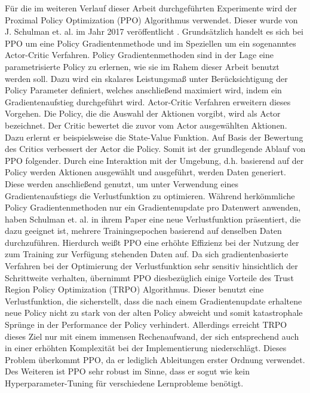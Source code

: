 Für die im weiteren Verlauf dieser Arbeit durchgeführten Experimente wird der Proximal Policy Optimization (PPO) Algorithmus verwendet. Dieser wurde von J. Schulman et. al. im Jahr 2017 veröffentlicht \cite{PPO}. Grundsätzlich handelt es sich bei PPO um eine Policy Gradientenmethode und im Speziellen um ein sogenanntes Actor-Critic Verfahren. Policy Gradientenmethoden sind in der Lage eine parametrisierte Policy zu erlernen, wie sie im Rahem dieser Arbeit benutzt werden soll. Dazu wird ein skalares Leistungsmaß unter Berücksichtigung der Policy Parameter definiert, welches anschließend maximiert wird, indem ein Gradientenaufstieg durchgeführt wird. Actor-Critic Verfahren erweitern dieses Vorgehen. Die Policy, die die Auswahl der Aktionen vorgibt, wird als Actor bezeichnet. Der Critic bewertet die zuvor vom Actor ausgewählten Aktionen. Dazu erlernt er beispielsweise die State-Value Funktion. Auf Basis der Bewertung des Critics verbessert der Actor die Policy. Somit ist der grundlegende Ablauf von PPO folgender. Durch eine Interaktion mit der Umgebung, d.h. basierend auf der Policy werden Aktionen ausgewählt und ausgeführt, werden Daten generiert. Diese werden anschließend genutzt, um unter Verwendung eines Gradientenaufstiegs die Verlustfunktion zu optimieren. Während herkömmliche Policy Gradientenmethoden nur ein Gradientenupdate pro Datenwert anwenden, haben Schulman et. al. in ihrem Paper eine neue Verlustfunktion präsentiert, die dazu geeignet ist, mehrere Trainingsepochen basierend auf denselben Daten durchzuführen. Hierdurch weißt PPO eine erhöhte Effizienz bei der Nutzung der zum Training zur Verfügung stehenden Daten auf. Da sich gradientenbasierte Verfahren bei der Optimierung der Verlustfunktion sehr sensitiv hinsichtlich der Schrittweite verhalten, übernimmt PPO diesbezüglich einige Vorteile des Trust Region Policy Optimization (TRPO) Algorithmus. Dieser benutzt eine Verlustfunktion, die sicherstellt, dass die nach einem Gradientenupdate erhaltene neue Policy nicht zu stark von der alten Policy abweicht und somit katastrophale Sprünge in der Performance der Policy verhindert. Allerdings erreicht TRPO dieses Ziel nur mit einem immensen Rechenaufwand, der sich entsprechend auch in einer erhöhten Komplexität bei der Implementierung niederschlägt. Dieses Problem überkommt PPO, da er lediglich Ableitungen erster Ordnung verwendet. Des Weiteren ist PPO sehr robust im Sinne, dass er sogut wie kein Hyperparameter-Tuning für verschiedene Lernprobleme benötigt. \\

